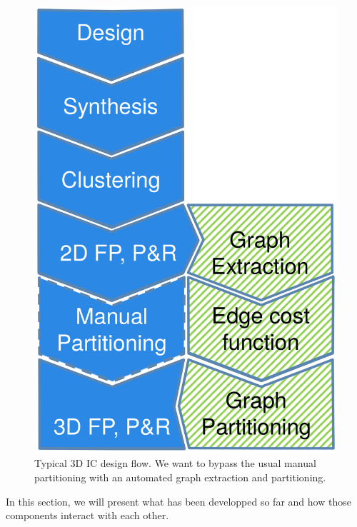 \documentclass[11pt,a4paper]{report} %
\theoremstyle{customdef}
\begin{document}
\begin{figure}[!h]
	\centering
	\includegraphics[width=.35\textwidth]{img/flow.png}
	\caption{Typical 3D IC design flow. We want to bypass the usual manual partitioning with an automated graph extraction and partitioning.}
	\label{fig:flow}
\end{figure}

In this section, we will present what has been developped so far and how those components interact with each other.

\end{document}
